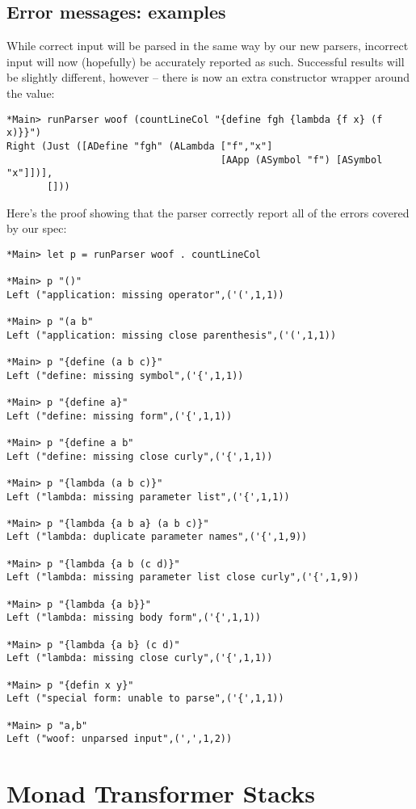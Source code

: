 \documentclass{tmr}
\begin{document}
\subsection{Error messages:  examples}
While correct input will be parsed in the same way by our new parsers, incorrect input will now (hopefully) be
accurately reported as such.  Successful results will be slightly different, however -- there is now an extra
constructor wrapper around the value:
\begin{verbatim}
*Main> runParser woof (countLineCol "{define fgh {lambda {f x} (f x)}}")
Right (Just ([ADefine "fgh" (ALambda ["f","x"] 
                                     [AApp (ASymbol "f") [ASymbol "x"]])],
       []))
\end{verbatim}
Here's the proof showing that the parser correctly report all of the errors 
covered by our spec:
\begin{verbatim}
*Main> let p = runParser woof . countLineCol

*Main> p "()"
Left ("application: missing operator",('(',1,1))

*Main> p "(a b"
Left ("application: missing close parenthesis",('(',1,1))

*Main> p "{define (a b c)}"
Left ("define: missing symbol",('{',1,1))

*Main> p "{define a}"
Left ("define: missing form",('{',1,1))

*Main> p "{define a b"
Left ("define: missing close curly",('{',1,1))

*Main> p "{lambda (a b c)}"
Left ("lambda: missing parameter list",('{',1,1))

*Main> p "{lambda {a b a} (a b c)}"
Left ("lambda: duplicate parameter names",('{',1,9))

*Main> p "{lambda {a b (c d)}"
Left ("lambda: missing parameter list close curly",('{',1,9))

*Main> p "{lambda {a b}}"
Left ("lambda: missing body form",('{',1,1))

*Main> p "{lambda {a b} (c d)"
Left ("lambda: missing close curly",('{',1,1))

*Main> p "{defin x y}"
Left ("special form: unable to parse",('{',1,1))

*Main> p "a,b"
Left ("woof: unparsed input",(',',1,2))
\end{verbatim}




\section{Monad Transformer Stacks}
\end{document}
